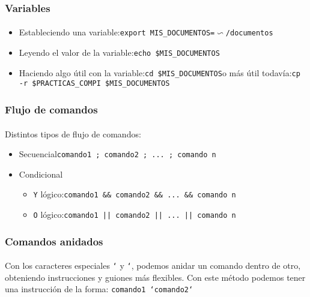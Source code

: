 \documentclass[12pt]{beamer}
\begin{document}
\begin{frame}
  \frametitle{Variables}
  \framesubtitle{}
  \begin{itemize}
    \item Estableciendo una variable:\medskip\linebreak\texttt{export MIS\_DOCUMENTOS=$\backsim$/documentos}
    \medskip
    \item Leyendo el valor de la variable:\medskip\linebreak\texttt{echo \$MIS\_DOCUMENTOS}
    \medskip
    \item Haciendo algo útil con la variable:\medskip\linebreak\texttt{cd \$MIS\_DOCUMENTOS}\medskip\linebreak o más útil todavía:\medskip\linebreak\texttt{cp -r \$PRACTICAS\_COMPI \$MIS\_DOCUMENTOS}
  \end{itemize}
\end{frame}

\begin{frame}
  \frametitle{Flujo de comandos}
  \framesubtitle{}
  Distintos tipos de flujo de comandos:
  \medskip
  \begin{itemize}
    \item Secuencial\medskip\linebreak\texttt{comando1 ; comando2 ; ... ; comando n}
    \medskip
    \item Condicional
    \medskip
    \begin{itemize}
      \item \texttt{Y} lógico:\medskip\linebreak\texttt{comando1 \&\& comando2 \&\& ... \&\& comando n}
      \medskip
      \item \texttt{O} lógico:\medskip\linebreak\texttt{comando1 || comando2 || ... || comando n}
    \end{itemize}
  \end{itemize}
\end{frame}

\begin{frame}
  \frametitle{Comandos anidados}
  \framesubtitle{}
  Con los caracteres especiales \texttt{`} y \texttt{`}, podemos anidar un comando dentro de otro, obteniendo instrucciones y guiones más flexibles.
  \medskip\linebreak
  Con este método podemos tener una instrucción de la forma:
  \medskip\linebreak
  \texttt{comando1 `comando2`}
\end{frame}
\end{document}
